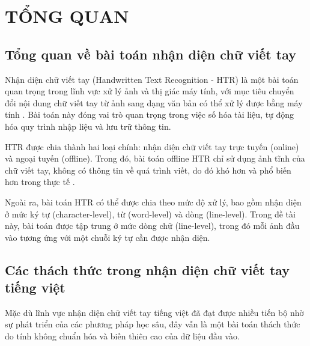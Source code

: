 \chapter{TỔNG QUAN} %

\label{Chapter2} %


\renewcommand{\keyword}[1]{\textbf{#1}}
\renewcommand{\tabhead}[1]{\textbf{#1}}
\renewcommand{\code}[1]{\texttt{#1}}
\renewcommand{\file}[1]{\texttt{\bfseries#1}}
\renewcommand{\option}[1]{\texttt{\itshape#1}}
\setcounter{secnumdepth}{3} 

\section{Tổng quan về bài toán nhận diện chữ viết tay}


Nhận diện chữ viết tay (Handwritten Text Recognition - HTR) là một bài toán quan trọng trong lĩnh vực xử lý ảnh và thị giác máy tính, với mục tiêu chuyển đổi nội dung chữ viết tay từ ảnh sang dạng văn bản có thể xử lý được bằng máy tính \cite{Reference5, Reference8}. Bài toán này đóng vai trò quan trọng trong việc số hóa tài liệu, tự động hóa quy trình nhập liệu và lưu trữ thông tin.

HTR được chia thành hai loại chính: nhận diện chữ viết tay trực tuyến (online) và ngoại tuyến (offline). Trong đó, bài toán offline HTR chỉ sử dụng ảnh tĩnh của chữ viết tay, không có thông tin về quá trình viết, do đó khó hơn và phổ biến hơn trong thực tế \cite{Reference8}.

Ngoài ra, bài toán HTR có thể được chia theo mức độ xử lý, bao gồm nhận diện ở mức ký tự (character-level), từ (word-level) và dòng (line-level). Trong đề tài này, bài toán được tập trung ở mức dòng chữ (line-level), trong đó mỗi ảnh đầu vào tương ứng với một chuỗi ký tự cần được nhận diện.

\section{Các thách thức trong nhận diện chữ viết tay tiếng việt}

Mặc dù lĩnh vực nhận diện chữ viết tay tiếng việt đã đạt được nhiều tiến bộ nhờ sự phát triển của các phương pháp học sâu, đây vẫn là một bài toán thách thức do tính không chuẩn hóa và biến thiên cao của dữ liệu đầu vào.


